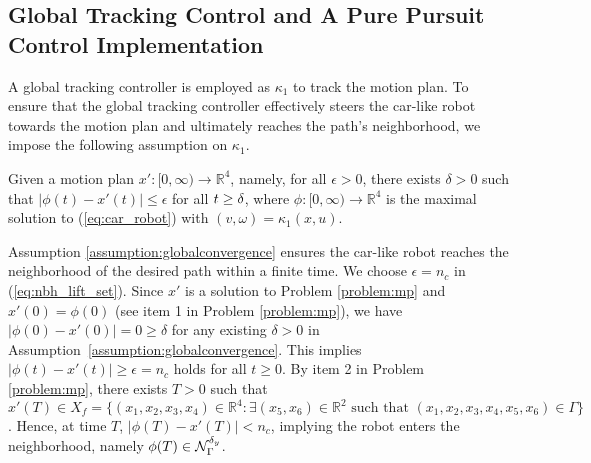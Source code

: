 


\subsection{Global Tracking Control and A Pure Pursuit Control Implementation} \label{sec:purepursuit}
A global tracking controller is employed as $\kappa_1$ to track the motion plan. To ensure that the global tracking controller effectively steers the car-like robot towards the motion plan and ultimately reaches the path's neighborhood, we impose the following assumption on $\kappa_{1}$.
\begin{assumption}\label{assumption:globalconvergence}
    Given a motion plan $x':[0, \infty)\to \mathbb{R}^{4}$,  namely, for all $\epsilon > 0$, there exists $\delta > 0$ such that $|\phi(t) - x'(t)| \leq \epsilon$
    for all $t \geq {\delta}$, where $\phi:[0, \infty)\to \mathbb{R}^{4}$ is the maximal solution to (\ref{eq:car_robot}) with $(v,\omega) = \kappa_1(x, u)$.
\end{assumption}
\begin{remark}
    Assumption \ref{assumption:globalconvergence} ensures the car-like robot reaches the neighborhood of the desired path within a finite time. We choose $\epsilon = n_{c}$ in (\ref{eq:nbh_lift_set}). Since $x'$ is a solution to Problem \ref{problem:mp} and $x'(0) = \phi(0)$ (see item 1 in Problem \ref{problem:mp}), we have $|\phi(0) - x'(0)| = 0 \geq \delta$ for any existing $\delta > 0$ in Assumption~\ref{assumption:globalconvergence}. This implies $|\phi(t) - x'(t)| \geq \epsilon = n_{c}$ holds for all $t \geq 0$. By item 2 in Problem \ref{problem:mp}, there exists $T > 0$ such that $ x'(T)\in X_{f} = \{(x_{1}, x_{2}, x_{3}, x_{4})\in \mathbb{R}^{4}: \exists (x_{5}, x_{6})\in \mathbb{R}^{2} \text{ such that } (x_{1}, x_{2}, x_{3}, x_{4}, x_{5}, x_{6})\in \Gamma\}$. Hence, at time $T$, $|\phi(T) - x'(T)| < n_{c}$, implying the robot enters the neighborhood, namely $\phi(T)\in\mathcal{N}_\Gamma^{\delta_{y}}$.
\end{remark}

